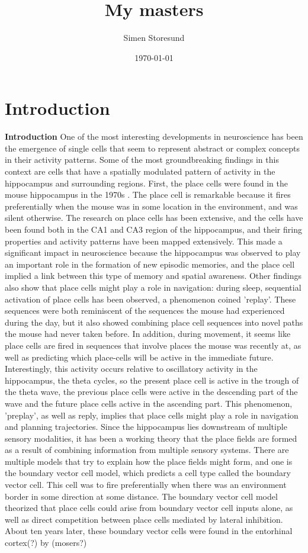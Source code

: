 \documentclass{article}
\title{My masters}
\author{Simen Storesund}
\date{\today}
\begin{document}
    \maketitle
    \section{Introduction}
    \textbf{Introduction} One of the most interesting developments in neuroscience has been the emergence of single cells that seem to represent abstract or complex concepts in their activity patterns. Some of the most groundbreaking findings in this context are cells that have a spatially modulated pattern of activity in the hippocampus and surrounding regions. First, the place cells were found in the mouse hippocampus in the 1970s \cite{OKeefe1976}. The place \cite{Barry2006} cell is remarkable because it fires preferentially when the mouse was in some location in the environment, and was silent otherwise. The research on place cells has been extensive, and the cells have been found both in the CA1 and CA3 region of the hippocampus, and their firing properties and activity patterns have been mapped extensively.
    This made a significant impact in neuroscience because the hippocampus was observed to play an important role in the formation of new episodic memories, and the place cell implied a link between this type of memory and spatial awareness.
    Other findings also show that place cells might play a role in navigation: during sleep, sequential activation of place cells has been observed, a phenomenon coined 'replay'. These sequences were both reminiscent of the sequences the mouse had experienced during the day, but it also showed combining place cell sequences into novel paths the mouse had never taken before.
    In addition, during movement, it seems like place cells are fired in sequences that involve places the mouse was recently at, as well as predicting which place-cells will be active in the immediate future. Interestingly, this activity occurs relative to oscillatory activity in the hippocampus, the theta cycles, so the present place cell is active in the trough of the theta wave, the previous place cells were active in the descending part of the wave and the future place cells active in the ascending part. This phenomenon, 'preplay', as well as reply, implies that place cells might play a role in navigation and planning trajectories.
    Since the hippocampus lies downstream of multiple sensory modalities, it has been a working theory that the place fields are formed as a result of combining information from multiple sensory systems. There are multiple models that try to explain how the place fields might form, and one is the boundary vector cell model, which predicts a cell type called the boundary vector cell. This cell was to fire preferentially when there was an environment border in some direction at some distance. The boundary vector cell model theorized that place cells could arise from boundary vector cell inputs alone, as well as direct competition between place cells mediated by lateral inhibition. About ten years later, these boundary vector cells were found in the entorhinal cortex(?) by (mosers?)
\end{document}
